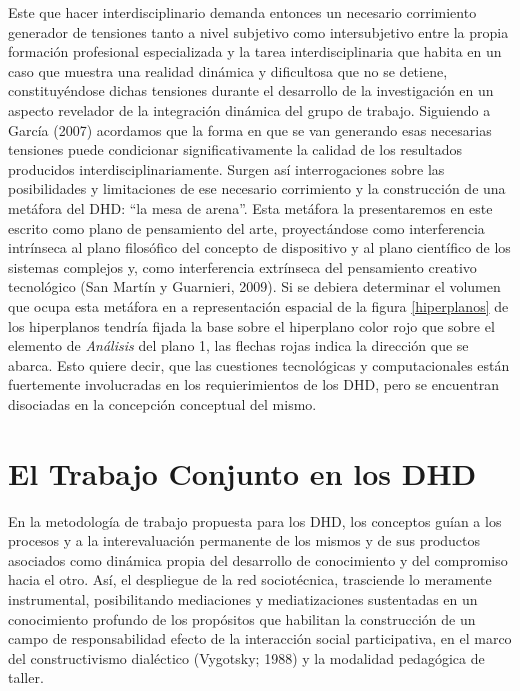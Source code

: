 Este que hacer interdisciplinario demanda entonces un necesario corrimiento   
generador de  tensiones   tanto  a  nivel   subjetivo como intersubjetivo
entre la propia formación profesional especializada y la tarea
interdisciplinaria que habita en un caso que muestra una realidad dinámica
y dificultosa que no se detiene, constituyéndose dichas tensiones durante
el desarrollo de la investigación en un aspecto revelador de la integración
dinámica del grupo de trabajo. Siguiendo a García (2007) acordamos que la forma
en que se van generando esas necesarias tensiones puede condicionar
significativamente la calidad de los resultados producidos
interdisciplinariamente. Surgen así interrogaciones sobre las posibilidades
y limitaciones de ese necesario corrimiento y la construcción de una metáfora
del DHD: “la mesa de arena”. Esta metáfora la presentaremos en este escrito como
plano de pensamiento del arte, proyectándose como interferencia intrínseca al
plano filosófico del concepto de dispositivo y al plano científico de los
sistemas complejos y, como interferencia extrínseca del pensamiento creativo
tecnológico (San Martín y Guarnieri, 2009). Si se debiera determinar el volumen
que ocupa esta metáfora en a representación espacial de la figura
\ref{hiperplanos} de los hiperplanos tendría fijada la base sobre el
hiperplano color rojo que sobre el elemento de \textit{Análisis} del plano 1,
las flechas rojas indica la dirección que se abarca. Esto quiere decir, que
las cuestiones tecnológicas y computacionales están fuertemente involucradas
en los requierimientos de los DHD, pero se encuentran disociadas en la
concepción conceptual del mismo. 


\section{El Trabajo Conjunto en los DHD}

En la metodología de trabajo propuesta para los DHD, los conceptos guían a los
procesos y a la interevaluación permanente de los mismos y de sus productos
asociados como dinámica propia del desarrollo de conocimiento y del
compromiso hacia el otro. Así, el despliegue de la red sociotécnica, trasciende
lo meramente  instrumental, posibilitando mediaciones y mediatizaciones
sustentadas en un conocimiento profundo de los propósitos que habilitan la
construcción de un campo de responsabilidad efecto de la interacción social
participativa, en el marco del constructivismo dialéctico (Vygotsky; 1988) y la
modalidad pedagógica de taller.

